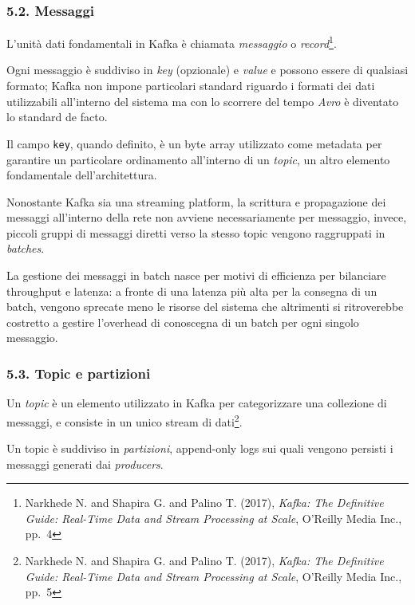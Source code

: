 \documentclass[]{article}
\begin{document}
\newpage

\subsubsection{5.2. Messaggi}\label{messaggi}

L'unità dati fondamentali in Kafka è chiamata \emph{messaggio} o
\emph{record}\footnote{Narkhede N. and Shapira G. and Palino T. (2017),
  \emph{Kafka: The Definitive Guide: Real-Time Data and Stream
  Processing at Scale}, O'Reilly Media Inc., pp.~4}.

Ogni messaggio è suddiviso in \emph{key} (opzionale) e \emph{value} e
possono essere di qualsiasi formato; Kafka non impone particolari
standard riguardo i formati dei dati utilizzabili all'interno del
sistema ma con lo scorrere del tempo \emph{Avro} è diventato lo standard
de facto.

Il campo \texttt{key}, quando definito, è un byte array utilizzato come
metadata per garantire un particolare ordinamento all'interno di un
\emph{topic}, un altro elemento fondamentale dell'architettura.

Nonostante Kafka sia una streaming platform, la scrittura e propagazione
dei messaggi all'interno della rete non avviene necessariamente per
messaggio, invece, piccoli gruppi di messaggi diretti verso la stesso
topic vengono raggruppati in \emph{batches}.

La gestione dei messaggi in batch nasce per motivi di efficienza per
bilanciare throughput e latenza: a fronte di una latenza più alta per la
consegna di un batch, vengono sprecate meno le risorse del sistema che
altrimenti si ritroverebbe costretto a gestire l'overhead di conoscegna
di un batch per ogni singolo messaggio.

\newpage

\subsubsection{5.3. Topic e partizioni}\label{topic-e-partizioni}

Un \emph{topic} è un elemento utilizzato in Kafka per categorizzare una
collezione di messaggi, e consiste in un unico stream di dati\footnote{Narkhede
  N. and Shapira G. and Palino T. (2017), \emph{Kafka: The Definitive
  Guide: Real-Time Data and Stream Processing at Scale}, O'Reilly Media
  Inc., pp.~5}.

Un topic è suddiviso in \emph{partizioni}, append-only logs sui quali
vengono persisti i messaggi generati dai \emph{producers}.
\end{document}
